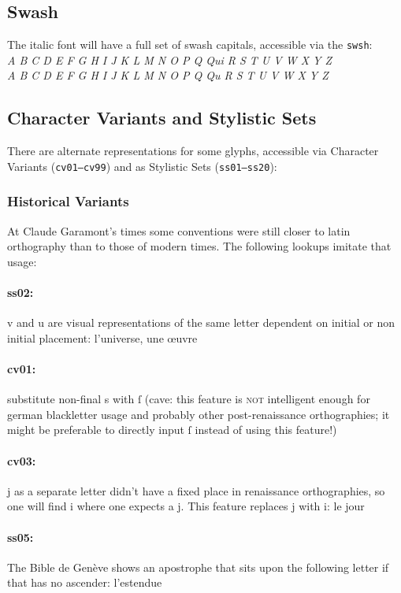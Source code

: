 \documentclass[pagesize,DIV14]{scrartcl}
\begin{document}
\subsection{Swash}
The italic font will have a full set of swash capitals, accessible via the \texttt{swsh}: \\\textit{A B C D E F G H I J K L M N O P Q Qui R S T U V W X Y Z\\
\scriptsize A B C D E F G H I J K L M N O P Q Qu R S T U V W X Y Z}
\subsection{Character Variants and Stylistic Sets}
There are alternate representations for some glyphs, accessible via Character Variants (\texttt{cv01–cv99}) and as Stylistic Sets (\texttt{ss01–ss20}):

\subsubsection{Historical Variants}

At Claude Garamont’s times some conventions were still closer to latin orthography than to those of modern times. The following lookups imitate that usage:

\paragraph{ss02:} v and u are visual representations of the same letter dependent on initial or non initial placement: {l’universe, une œuvre}
\paragraph*{cv01:} {substitute non-final s with ſ (cave: this feature is \textsc{not} intelligent enough for german blackletter usage and probably other post-renaissance orthographies; it might be preferable to directly input ſ instead of using this feature!)}
\paragraph*{cv03:} j as a separate letter didn’t have a fixed place  in renaissance orthographies, so one will find i where one expects a j. This feature replaces j with i: {le jour}
\paragraph*{ss05:} The Bible de Genève shows an apostrophe that sits upon the following letter if that has no ascender: {l’estendue}
\end{document}
